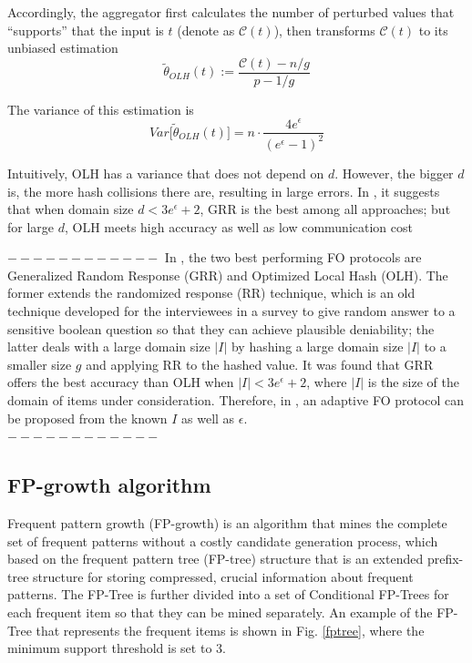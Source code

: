 \documentclass[conference]{IEEEtran}
\begin{document}
Accordingly, the aggregator first calculates the number of perturbed values that ``supports'' that the input is $t$ (denote as $\mathcal{C}(t)$), then transforms $\mathcal{C}(t)$ to its unbiased estimation
\begin{equation}
\tilde{\theta}_{OLH}(t) := \frac{\mathcal{C}(t) - n/g}{p-1/g}
\label{olh aggregate}
\end{equation}

The variance of this estimation is 
\begin{equation}
Var\big[\tilde{\theta}_{OLH}(t)\big] =n \cdot \frac{4e^{\epsilon}}{{(e^{\epsilon}-1)}^2}
\label{olh variance}
\end{equation}

Intuitively, OLH has a variance that does not depend on $d$. However, the bigger $d$ is, the more hash collisions there are, resulting in large errors. In \cite{a8}, it suggests that when domain size $d<3e^{\epsilon} +2$, GRR is the best among all approaches; but for large $d$, OLH meets high accuracy as well as low communication cost


$------------$
{\color{red}In \cite{a8}, the two best performing FO protocols are Generalized Random Response (GRR) and Optimized Local Hash (OLH). The former extends the randomized response (RR) technique\cite{rr}, which is an old technique developed for the interviewees in a survey to give random answer to a sensitive boolean question so that they can achieve plausible deniability; the latter deals with a large domain size $|I|$ by hashing a large domain size $|I|$ to a smaller size $g$ and applying RR to the hashed value. It was found that GRR offers the best accuracy than OLH when $|I| < 3e^{\epsilon} + 2$, where $|I|$ is the size of the domain of items under consideration. Therefore, in  \cite{a2}, an adaptive FO protocol can be proposed from the known $I$ as well as $\epsilon$.\\}
$------------$

\subsection{FP-growth algorithm}
Frequent pattern growth (FP-growth)\cite{fp} is an algorithm that mines the complete set of frequent patterns without a costly candidate generation process, which based on the frequent pattern tree (FP-tree) structure that is an extended prefix-tree structure for storing compressed, crucial information about frequent patterns. The FP-Tree is further divided into a set of Conditional FP-Trees for each frequent item so that they can be mined separately. An example of the FP-Tree that represents the frequent items is shown in Fig. \ref{fptree}, where the minimum support threshold is set to 3.
\end{document}
